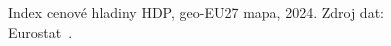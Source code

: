 \def\strEuCenovaHladinaTitle{Index cenové hladiny \acs{HDP} (2024)}%
\def\strEuCenovaHladinaColorbarLabel{\acs{PLI} [\acs{geo-EU}27 = 100]}%
\def\strEuCenovaHladinaCaption{Index cenové hladiny \acs{HDP}, \acs{geo-EU}27 mapa, 2024. Zdroj dat: Eurostat~\cite{eurostat_prc_ppp_ind_PLI_GDP}.}%
%

\providecommand\NudgeEuCenovaHladinaCz{0pt}%
\providecommand\NudgeEuCenovaHladinaAt{0pt}%
\providecommand\NudgeEuCenovaHladinaDe{0pt}%
\providecommand\NudgeEuCenovaHladinaDk{0pt}%
\providecommand\NudgeEuCenovaHladinaPl{0pt}%
\providecommand\NudgeEuCenovaHladinaSk{0pt}%
\begin{figure}[H]
  \centering
  \resizebox{\linewidth}{!}{}
  \caption{\strEuCenovaHladinaCaption}
  \label{fig:eu_cenova_hladina}
\end{figure}
